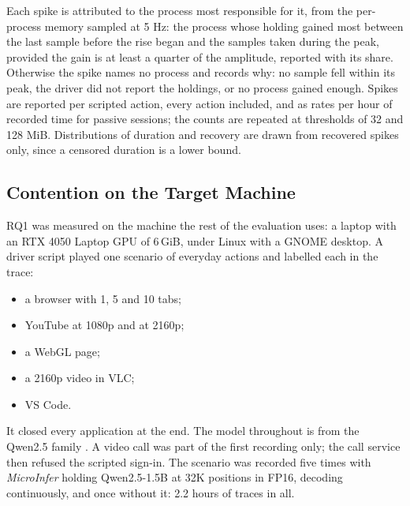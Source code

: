\documentclass[11pt]{article}
\begin{document}
Each spike is attributed to the process most responsible for it, from the
per-process memory sampled at 5 Hz: the process whose holding gained most
between the last sample before the rise began and the samples taken during the
peak, provided the gain is at least a quarter of the amplitude, reported with
its share. Otherwise the spike names no process and records why: no sample fell
within its peak, the driver did not report the holdings, or no process gained
enough. Spikes are reported per scripted action, every action included, and as
rates per hour of recorded time for passive sessions; the counts are repeated at
thresholds of 32 and 128 MiB. Distributions of duration and recovery are drawn
from recovered spikes only, since a censored duration is a lower bound.

\subsection{Contention on the Target Machine}
\label{sec:contention}

RQ1 was measured on the machine the rest of the evaluation uses: a laptop with
an RTX 4050 Laptop GPU of 6\,GiB, under Linux with a GNOME desktop. A driver
script played one scenario of everyday actions and labelled each in the trace:
\begin{itemize}
\item a browser with 1, 5 and 10 tabs;
\item YouTube at 1080p and at 2160p;
\item a WebGL page;
\item a 2160p video in VLC;
\item VS Code.
\end{itemize}
It closed every application at the end. The model throughout is from the Qwen2.5
family \cite{qwen2024report}. A video call was part of the first
recording only; the call service then refused the scripted sign-in. The scenario was recorded five times
with \textit{MicroInfer} holding Qwen2.5-1.5B at 32K positions in FP16,
decoding continuously, and once without it: 2.2 hours of traces in all.
\end{document}
